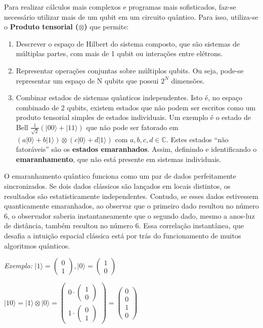 \documentclass[12pt, a4paper]{article}
\newcommand{\ket}[1]{\lvert #1 \rangle}
\begin{document}
Para realizar cálculos mais complexos e programas mais sofisticados, faz-se necessário utilizar mais de um qubit em um circuito quântico. Para isso, utiliza-se o \textbf{Produto tensorial ($\otimes$)} que permite:
\begin{enumerate}
    \item Descrever o espaço de Hilbert do sistema composto, que são sistemas de múltiplas partes, com mais de 1 qubit ou interações entre elétrons.
    \item Representar operações conjuntas sobre múltiplos qubits. Ou seja, pode-se representar um espaço de N qubits que possui $2^N$ dimensões.
    \item Combinar estados de sistemas quânticos independentes. Isto é, no espaço combinado de 2 qubits, existem estados que não podem ser escritos como um produto tensorial simples de estados individuais. Um exemplo é o estado de Bell \(\frac{1}{\sqrt{2}}(\ket{00}+\ket{11})\) que não pode ser fatorado em \((a\ket{0}+b\ket{1}) \otimes (c\ket{0}+d\ket{1})\) com $a,b,c,d\in\mathbb{C}$. Estes estados ``não fatoráveis'' são os \textbf{estados emaranhados}. Assim, definindo e identificando o \textbf{emaranhamento}, que não está presente em sistemas individuais.
\end{enumerate}

O emaranhamento quântico funciona como um par de dados perfeitamente sincronizados. Se dois dados clássicos são lançados em locais distintos, os resultados são estatisticamente independentes. Contudo, se esses dados estivessem quanticamente emaranhados, ao observar que o primeiro dado resultou no número 6, o observador saberia instantaneamente que o segundo dado, mesmo a anos-luz de distância, também resultou no número 6. Essa correlação instantânea, que desafia a intuição espacial clássica %
está por trás do funcionamento de muitos algoritmos quânticos.

\textit{Exemplo:} 
\(\ket{1} = 
\begin{pmatrix}
    0 \\
    1
\end{pmatrix} ,  
\ket{0} = 
\begin{pmatrix}
    1 \\
    0
\end{pmatrix}
\)

\(\ket{10} = \ket{1} \otimes \ket{0} = 
\begin{pmatrix}
    0 \cdot \begin{pmatrix}
        1 \\
        0
    \end{pmatrix} \\
    1 \cdot \begin{pmatrix}
        0 \\
        1
    \end{pmatrix}
\end{pmatrix} = 
\begin{pmatrix}
    0 \\
    0 \\
    1 \\
    0
\end{pmatrix}
\)
\end{document}
